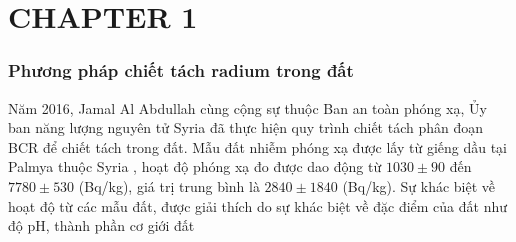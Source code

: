 \chapter{CHAPTER 1}
\subsection{Phương pháp chiết tách radium trong đất}


Năm 2016, Jamal Al Abdullah cùng cộng sự thuộc Ban an toàn phóng xạ, Ủy ban năng lượng nguyên tử Syria đã thực hiện quy trình chiết tách phân đoạn BCR để chiết tách  trong đất. Mẫu đất nhiễm phóng xạ  được lấy từ giếng dầu tại Palmya thuộc Syria \footnotemark, hoạt độ phóng xạ  đo được dao động từ  $1030 \pm 90$ đến $7780 \pm 530 $ (Bq/kg), giá trị trung bình là $2840 \pm 1840$ (Bq/kg). Sự khác biệt về hoạt độ  từ các mẫu đất, được giải thích do sự khác biệt về đặc điểm của đất như độ pH, thành phần cơ giới đất \footnotemark



